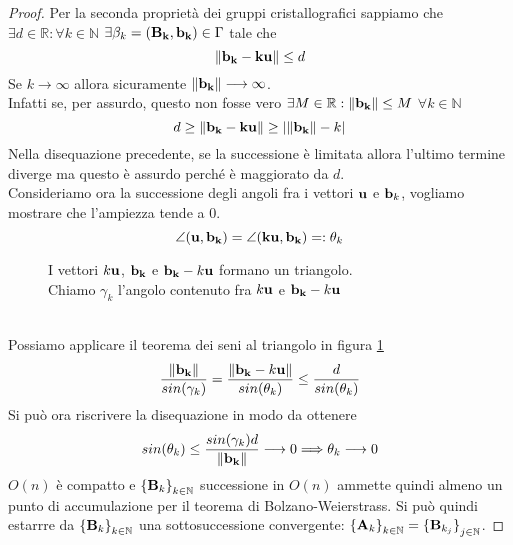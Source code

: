 \documentclass[a4paper]{book}
\begin{document}
\begin{proof}
Per la seconda proprietà dei gruppi cristallografici sappiamo che \\
$ \exists d \in \mathbb{R} : \forall k \in \mathbb{N} $ $  \exists \beta_k = \vb{( B_k, b_k)} \in \Gamma  $ tale che 
\[  \norm{\vb{b_k - ku }} \leq d \]
Se $k \longrightarrow \infty$ allora sicuramente $ \norm{\vb{b_k}} \longrightarrow \infty$.  \\
Infatti se, per assurdo, questo non fosse vero $\exists M \in \mathbb{R} : \norm{\vb{b_k}} \leq M $   $  \forall k \in \mathbb{N} $
\[ d \geq \norm{\vb{b_k - ku}} \geq | \norm{\vb{b_k}} - k | \]
Nella disequazione  precedente, se la successione è limitata allora l'ultimo termine diverge ma questo è assurdo perché è maggiorato da $d$. \\
Consideriamo ora la successione degli angoli fra i vettori $\vb{u}$ e $\vb{b}_k$, vogliamo mostrare che l'ampiezza tende a 0. 
\[ \angle (\vb{u , b_k}) = \angle (\vb{ku, b_k}) = : \theta_k \]
\begin{figure}[!h]
\centering
{}
\caption{I vettori $k \vb{u}$, $\vb{b_k}$ e $\vb{b_k}-k\vb{u}$ formano un triangolo. \\ Chiamo $\gamma_k$ l'angolo contenuto fra $k \vb{u}$ e $\vb{b_k}-k\vb{u}$}
\label{fig:trangolo1}
\end{figure} \\
Possiamo applicare il teorema dei seni al triangolo in figura \ref{fig:trangolo1}
\[ \frac{\norm{\vb{b_k}}}{sin(\gamma_k)} = \frac{\norm{\vb{b_k} - k\vb{u}}}{sin(\theta_k)}  \leq \frac{d}{sin(\theta_k)} \]
Si può ora riscrivere la disequazione in modo da ottenere
\[  sin(\theta_k) \leq \frac{sin(\gamma_k)d}{\norm{\vb{b_k}}} \longrightarrow 0 \Longrightarrow \theta_k \longrightarrow 0 \]
$O(n)$  è compatto e ${ \{\vb{B}_k \} }_{k \in \mathbb{N}}$ successione in  $O(n)$  ammette quindi almeno un punto di accumulazione per il teorema di Bolzano-Weierstrass. Si può quindi estarrre da ${ \{ \vb{B}_k \}}_{k \in \mathbb{N}}$  una sottosuccessione  convergente: $ { \{ \vb{A}_k \} }_{k \in \mathbb{N}} = { \{ \vb{B}_{k_j} \} }_{j \in \mathbb{N}}$. 

\end{proof}
\end{document}
